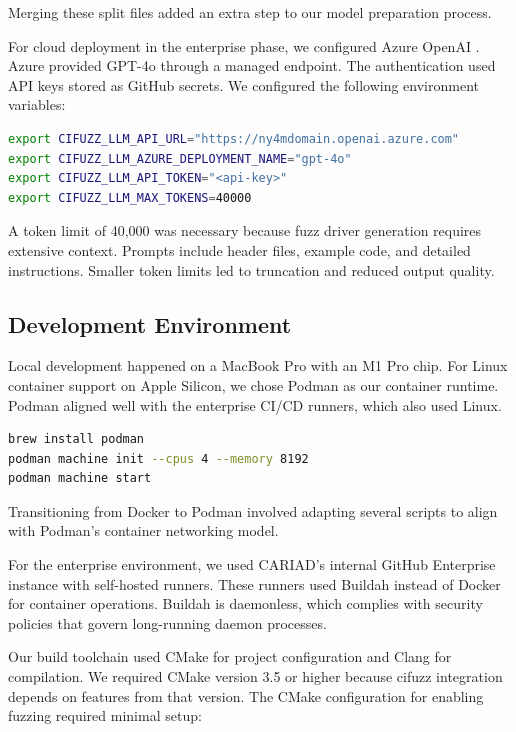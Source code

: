 Merging these split files added an extra step to our model preparation process.

For cloud deployment in the enterprise phase, we configured Azure OpenAI \cite{azure_openai}. Azure provided GPT-4o through a managed endpoint. The authentication used API keys stored as GitHub secrets. We configured the following environment variables:

\begin{lstlisting}[language=bash, caption={Azure OpenAI Configuration}]
export CIFUZZ_LLM_API_URL="https://ny4mdomain.openai.azure.com"
export CIFUZZ_LLM_AZURE_DEPLOYMENT_NAME="gpt-4o"
export CIFUZZ_LLM_API_TOKEN="<api-key>"
export CIFUZZ_LLM_MAX_TOKENS=40000
\end{lstlisting}

A token limit of 40,000 was necessary because fuzz driver generation requires extensive context. Prompts include header files, example code, and detailed instructions. Smaller token limits led to truncation and reduced output quality.

\subsection{Development Environment}

Local development happened on a MacBook Pro with an M1 Pro chip. For Linux container support on Apple Silicon, we chose Podman as our container runtime. Podman aligned well with the enterprise CI/CD runners, which also used Linux.

\begin{lstlisting}[language=bash, caption={Podman Setup on macOS}]
brew install podman
podman machine init --cpus 4 --memory 8192
podman machine start
\end{lstlisting}

Transitioning from Docker to Podman involved adapting several scripts to align with Podman's container networking model.

For the enterprise environment, we used CARIAD's internal GitHub Enterprise instance with self-hosted runners. These runners used Buildah \cite{buildah} instead of Docker for container operations. Buildah is daemonless, which complies with security policies that govern long-running daemon processes.

Our build toolchain used CMake for project configuration and Clang for compilation. We required CMake version 3.5 or higher because cifuzz integration depends on features from that version. The CMake configuration for enabling fuzzing required minimal setup:

